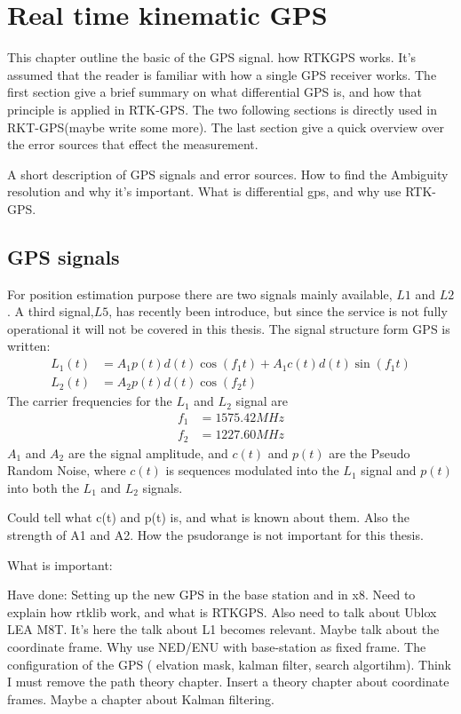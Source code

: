 
\chapter{Real time kinematic GPS}
This chapter outline the basic of the GPS signal. how RTKGPS works. It's assumed that the reader is familiar with how a single GPS receiver works. The first section give a brief summary on what differential GPS is, and how that principle is applied in RTK-GPS. The two following sections is directly used in RKT-GPS(maybe write some more). The last section give a quick overview over the error sources that effect the measurement.

A short description of GPS signals and error sources. How to find the Ambiguity resolution and why it's important. What is differential gps, and why use RTK-GPS.


\section{GPS signals}
For position estimation purpose there are two signals mainly available, $L1$ and $L2$. A third signal,$L5$, has recently been introduce, but since the service is not fully operational it will not be covered in this thesis. The signal structure form GPS is written:
\begin{align*}
L_1(t) &= A_1p(t)d(t)\cos(f_1t) + A_1c(t)d(t)\sin(f_1t) \\
L_2(t) &= A_2p(t)d(t)\cos(f_2t)
\end{align*}
The carrier frequencies for the $L_1$ and $ L_2$ signal are
\begin{align*}
f_1 &= 1575.42 MHz \\
f_2 &= 1227.60 MHz
\end{align*}
$A_1$ and $A_2$ are the signal amplitude, and $c(t)$ and $p(t)$ are the Pseudo Random Noise, where $c(t)$ is sequences modulated into the $L_1$ signal and $p(t)$ into both the $L_1$ and $L_2$ signals.

Could tell what c(t) and p(t) is, and what is known about them. Also the strength of A1 and A2. How the psudorange is not important for this thesis.

What is important:

Have done: Setting up the new GPS in the base station and in x8. Need to explain how rtklib work, and what is RTKGPS. Also need to talk about Ublox LEA M8T. It's here the talk about L1 becomes relevant. Maybe talk about the coordinate frame. Why use NED/ENU with base-station as fixed frame. The configuration of the GPS ( elvation mask, kalman filter, search algortihm). Think I must remove the path theory chapter. Insert a theory chapter about coordinate frames. Maybe a chapter about Kalman filtering.
 
